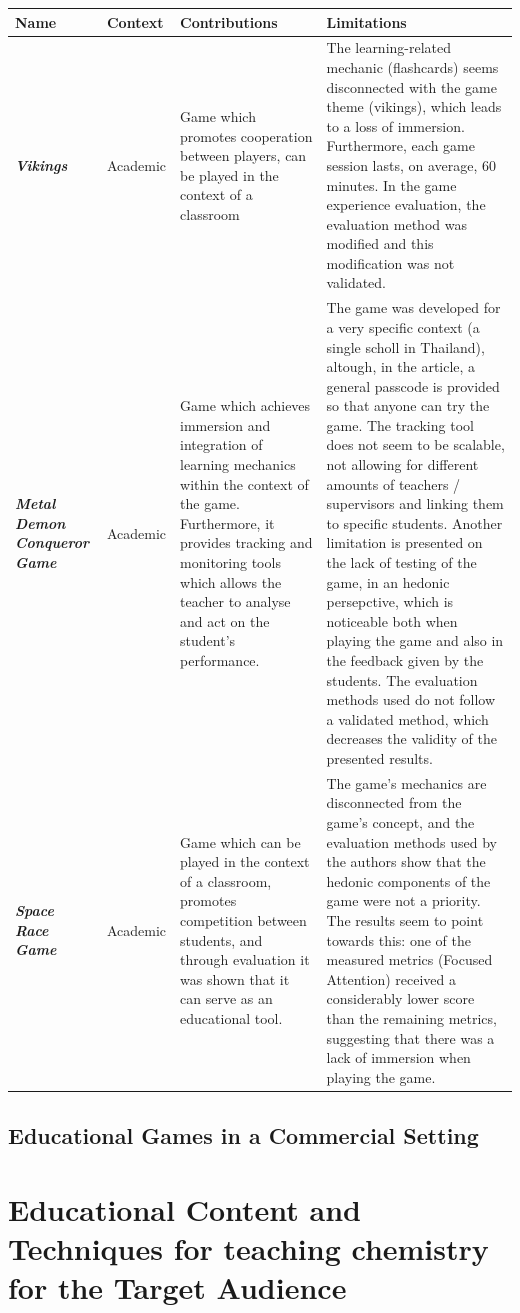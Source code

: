 \begin{table}[ht]
\centering
\small
\begin{tabularx}{\textwidth}{
    >{\raggedright\arraybackslash}p{2.5cm}
    || >{\raggedright\arraybackslash}p{1.5cm}
    | X | X
}

    \textbf{Name} & \textbf{Context} & \textbf{Contributions} & \textbf{Limitations} \\
    \hline
    \textbf{\textit{Vikings}} \cite{daSilvaJnior2024vikings}
    & Academic
    & Game which promotes cooperation between players, can be played in the context of a classroom
    & The learning-related mechanic (flashcards) seems disconnected with the game theme (vikings), which leads to a loss of immersion. Furthermore, each game session lasts, on average, 60 minutes. In the game experience evaluation, the evaluation method was modified and this modification was not validated.
    \\
    \hline
    \textbf{\textit{Metal Demon Conqueror Game}} \cite{Pinthong2024}
    & Academic
    & Game which achieves immersion and integration of learning mechanics within the context of the game. Furthermore, it provides tracking and monitoring tools which allows the teacher to analyse and act on the student's performance.
    & The game was developed for a very specific context (a single scholl in Thailand), altough, in the article, a general passcode is provided so that anyone can try the game. The tracking tool does not seem to be scalable, not allowing for different amounts of teachers / supervisors and linking them to specific students. Another limitation is presented on the lack of testing of the game, in an hedonic persepctive, which is noticeable both when playing the game and also in the feedback given by the students. The evaluation methods used do not follow a validated method, which decreases the validity of the presented results.
    \\
    \hline
    \textbf{\textit{Space Race Game}} \cite{daSilvaJnior2024spacerace}
    & Academic
    & Game which can be played in the context of a classroom, promotes competition between students, and through evaluation it was shown that it can serve as an educational tool.
    & The game's mechanics are disconnected from the game's concept, and the evaluation methods used by the authors show that the hedonic components of the game were not a priority. The results seem to point towards this: one of the measured metrics (Focused Attention) received a considerably lower score than the remaining metrics, suggesting that there was a lack of immersion when playing the game.
    \\
    \hline
    \hline
\end{tabularx}
\end{table}



\subsection{Educational Games in a Commercial Setting}

\section{Educational Content and Techniques for teaching chemistry for the Target Audience}


